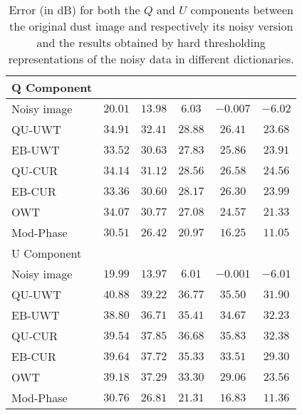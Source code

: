 \begin{table}
\caption{ Error (in dB) for both the $Q$ and $U$ components between the original dust image and  respectively 
its noisy version and the results obtained by hard thresholding representations of the noisy data in different dictionaries.}
\begin{tabular}{l|ccccc}\hline
Q Component   &                    &  &  & &  \\      \hline
   Noisy image   & $20.01$    &   $13.98$   &   $6.03$     &   $-0.007$   &   $-6.02$   \\      \hline \hline
QU-UWT            &  $34.91$   &   $32.41$   &   $28.88$   &   $26.41$    &   $23.68$ \\
EB-UWT            &   $33.52$   &  $30.63$   &   $27.83$   &  $25.86$     &   $23.91$   \\
QU-CUR           &   $34.14$   &  $ 31.12$     &    $28.56$   &  $26.58$  &    $24.56$   \\
EB-CUR           &    $ 33.36$   &  $30.60$   &    $28.17$   &  $26.30$    &   $ 23.99$    \\   
OWT                   &   $34.07$   & $30.77$   &    $27.08$   &   $24.57$   &    $21.33$     \\    
Mod-Phase     &    $30.51$    & $26.42$  &     $20.97$   &    $16.25$  &   $11.05$  \\
\hline
U Component  &                 &  &  & &                \\      \hline
Noisy image   & $19.99$    &   $13.97$   &   $6.01$     &   $-0.001$      &   $-6.01$   \\      \hline  \hline
QU-UWT           &   $40.88$   &   $39.22$   &   $36.77$   &   $35.50$     &   $31.90$ \\
EB-UWT            &   $38.80$   &  $36.71$   &   $35.41$   &  $34.67$       &   $32.23$  \\
QU-CUR           &   $39.54$   &  $ 37.85$     &    $36.68$   &  $35.83$    & $32.38$     \\
EB-CUR            &    $39.64$   &  $ 37.72$   &    $35.33$   &  $33.51$    &  $29.30$    \\     
OWT                   &   $39.18$    & $37.29$   &    $33.30$   &   $29.06$   &    $23.56$   \\ 
Mod-Phase     &    $30.76$    & $26.81$  &     $21.31$   &    $16.83$  &   $11.36$  \\  \hline
\hline
\end{tabular}\label{tab_psnr_pol_dust}
\end{table}

